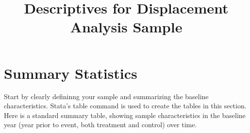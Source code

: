 \documentclass{article}
\begin{document}
\title{Descriptives for Displacement Analysis Sample}
\maketitle
\section{Summary Statistics}
Start by clearly defininng your sample and summarizing the baseline characteristics.
Stata's table command is used to create the tables in this section.\\
Here is a standard summary table, showing sample characteristics in
the baseline year (year prior to event, both treatment and control) over time.
\begin{table}[htbp] 
\centering 
\begin{threeparttable} 
\caption{Summary Statistics in Baseline Year over Time} 


\end{threeparttable}
\end{table}
\end{document}
